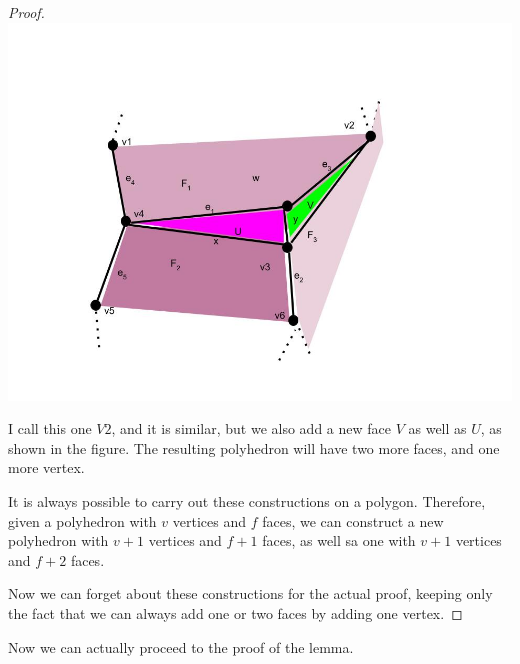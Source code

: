 \documentclass[12pt]{article}
\theoremstyle{definition}
\begin{document}
\begin{proof}
\includegraphics[scale=0.5]{V2.jpg} 

I call this one $V2$, and it is similar, but we also add a new face $V$ as well as $U$, as shown in the figure. The resulting polyhedron will have two more faces, and one more vertex.

It is always possible to carry out these constructions on a polygon. Therefore, given a polyhedron with $v$ vertices and $f$ faces, we can construct a new polyhedron with $v+1$ vertices and $f + 1$ faces, as well sa one with $v+1$ vertices and $f+2$ faces.

Now we can forget about these constructions for the actual proof, keeping only the fact that we can always add one or two faces by adding one vertex. 


\end{proof}

Now we can actually proceed to the proof of the lemma.
\end{document}
